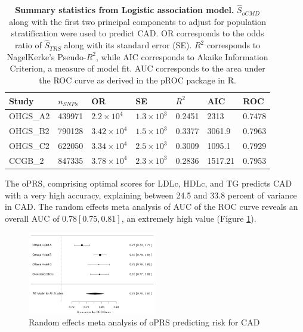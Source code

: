 \begin{table}[H]
\centering

\begin{tabular}{lllllll}
\hline
Study & $n_{SNPs}$ & OR         & SE      & $R^2$     & AIC     & ROC    \\ \hline
OHGS\_A2 & 439971 & $2.2\times10^4$  & $1.3\times10^3$ & 0.2451 & 2313    & 0.7478 \\
OHGS\_B2 & 790128 & $3.42\times10^4$ & $1.5\times10^3$ & 0.3377 & 3061.9  & 0.7963 \\
OHGS\_C2 & 622050 & $3.34\times10^4$ & $2.5\times10^3$ & 0.3009 & 1095.1  & 0.7929 \\
CCGB\_2 & 847335 & $3.78\times10^4$ & $2.3\times10^3$ & 0.2836 & 1517.21 & 0.7953 \\ \hline
\end{tabular}
\label{oprs_ss}
\caption[Summary statistics from Logistic association model for $\hat{S}_{oCMD}$.]{\textbf{Summary statistics from Logistic association model.} $\hat{S}_{oCMD}$ along with the first two principal components to adjust for population stratification were used to predict \ac{CAD}. OR corresponds to the odds ratio of $\hat{S}_{TRS}$ along with its standard error (SE). $R^2$ corresponds to NagelKerke's Pseudo-$R^2$, while AIC corresponds to Akaike Information Criterion, a measure of model fit. AUC corresponds to the area under the \ac{ROC} curve as derived in the pROC package in R.}
\end{table}

The \ac{oPRS}, comprising optimal scores for \ac{LDLc}, \ac{HDLc}, and \ac{TG} predicts \ac{CAD} with a very high accuracy, explaining between 24.5 and 33.8 percent of variance in \ac{CAD}. The random effects meta analysis of \ac{AUC} of the \ac{ROC} curve reveals an overall \ac{AUC} of $0.78 [0.75, 0.81]$, an extremely high value (Figure \ref{oprs_meta}). 

\begin{figure}[H]
\label{oprs_meta}
\caption{Random effects meta analysis of \ac{oPRS} predicting risk for \ac{CAD}}
\centering
\includegraphics[width=0.5\textwidth]{Figures/oprs_meta.png}
\end{figure}



